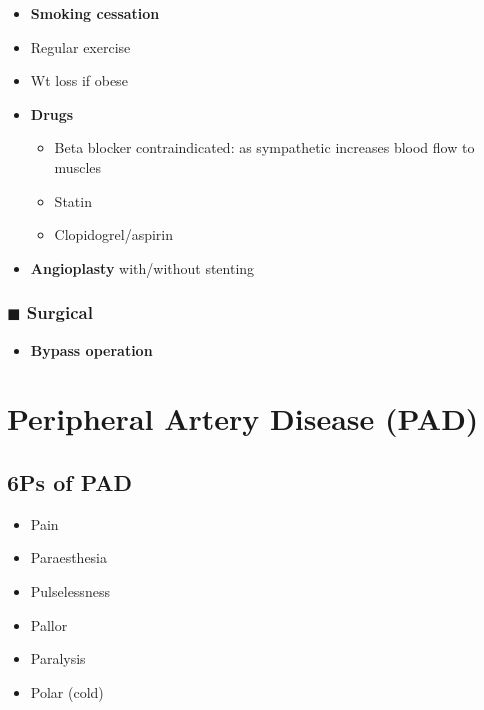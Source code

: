 \documentclass[
  14pt,
]{memoir}
\providecommand{\tightlist}{%
  \setlength{\itemsep}{0pt}\setlength{\parskip}{0pt}}
\begin{document}
\begin{itemize}
\tightlist
\item
  \textbf{Smoking cessation}
\item
  Regular exercise
\item
  Wt loss if obese
\item
  \textbf{Drugs}

  \begin{itemize}
  \tightlist
  \item
    Beta blocker contraindicated: as sympathetic increases blood flow to
    muscles
  \item
    Statin
  \item
    Clopidogrel/aspirin
  \end{itemize}
\item
  \textbf{Angioplasty} with/without stenting
\end{itemize}

\hypertarget{blacksquare-surgical}{%
\subsubsection{\texorpdfstring{\(\blacksquare\)
Surgical}{\textbackslash blacksquare Surgical}}\label{blacksquare-surgical}}

\begin{itemize}
\tightlist
\item
  \textbf{Bypass operation}
\end{itemize}

\pagebreak

\hypertarget{peripheral-artery-disease-pad}{%
\section{Peripheral Artery Disease
(PAD)}\label{peripheral-artery-disease-pad}}

\hypertarget{ps-of-pad}{%
\subsection{6Ps of PAD}\label{ps-of-pad}}

\begin{itemize}
\tightlist
\item
  Pain
\item
  Paraesthesia
\item
  Pulselessness
\item
  Pallor
\item
  Paralysis
\item
  Polar (cold)
\end{itemize}
\end{document}
